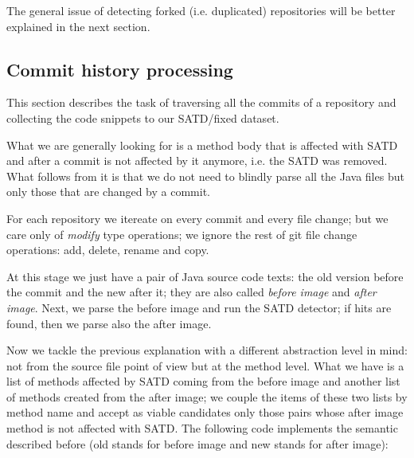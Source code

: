 The general issue of detecting forked (i.e. duplicated) repositories will be better explained in the next section.



\subsection{Commit history processing}

This section describes the task of traversing all the commits of a repository and collecting the code snippets to our SATD/fixed dataset.

What we are generally looking for is a method body that is affected with SATD and after a commit is not affected by it anymore, i.e. the SATD was removed. What follows from it is that we do not need to blindly parse all the Java files but only those that are changed by a commit.

For each repository we itereate on every commit and every file change; but we care only of \textit{modify} type operations; we ignore the rest of git file change operations: add, delete, rename and copy.

At this stage we just have a pair of Java source code texts: the old version before the commit and the new after it; they are also called \textit{before image} and \textit{after image}. Next, we parse the before image and run the SATD detector; if hits are found, then we parse also the after image.

Now we tackle the previous explanation with a different abstraction level in mind: not from the source file point of view but at the method level. 
What we have is a list of methods affected by SATD coming from the before image and another list of methods created from the after image; we couple the items of these two lists by method name and accept as viable candidates only those pairs whose after image method is not affected with SATD. The following code implements the semantic described before (old stands for before image and new stands for after image):

\begin{center}
\end{center}

